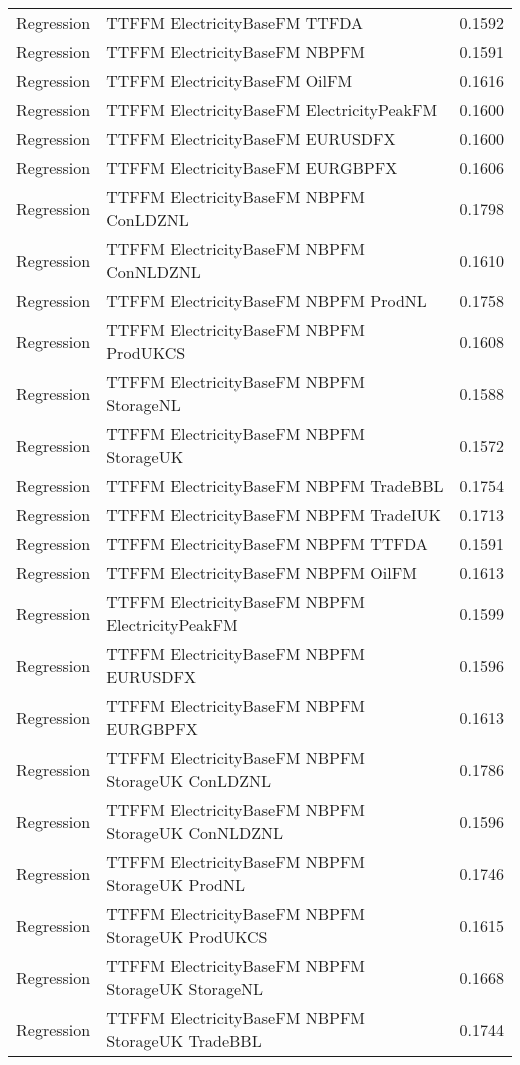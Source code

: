\begin{table}[h!]
\begin{adjustbox}{max width=\textwidth}
\begin{tabular}{llr}
  Regression & TTFFM ElectricityBaseFM TTFDA & 0.1592 \\ 
  Regression & TTFFM ElectricityBaseFM NBPFM & 0.1591 \\ 
  Regression & TTFFM ElectricityBaseFM OilFM & 0.1616 \\ 
  Regression & TTFFM ElectricityBaseFM ElectricityPeakFM & 0.1600 \\ 
  Regression & TTFFM ElectricityBaseFM EURUSDFX & 0.1600 \\ 
  Regression & TTFFM ElectricityBaseFM EURGBPFX & 0.1606 \\ 
  Regression & TTFFM ElectricityBaseFM NBPFM ConLDZNL & 0.1798 \\ 
  Regression & TTFFM ElectricityBaseFM NBPFM ConNLDZNL & 0.1610 \\ 
  Regression & TTFFM ElectricityBaseFM NBPFM ProdNL & 0.1758 \\ 
  Regression & TTFFM ElectricityBaseFM NBPFM ProdUKCS & 0.1608 \\ 
  Regression & TTFFM ElectricityBaseFM NBPFM StorageNL & 0.1588 \\ 
  Regression & TTFFM ElectricityBaseFM NBPFM StorageUK & 0.1572 \\ 
  Regression & TTFFM ElectricityBaseFM NBPFM TradeBBL & 0.1754 \\ 
  Regression & TTFFM ElectricityBaseFM NBPFM TradeIUK & 0.1713 \\ 
  Regression & TTFFM ElectricityBaseFM NBPFM TTFDA & 0.1591 \\ 
  Regression & TTFFM ElectricityBaseFM NBPFM OilFM & 0.1613 \\ 
  Regression & TTFFM ElectricityBaseFM NBPFM ElectricityPeakFM & 0.1599 \\ 
  Regression & TTFFM ElectricityBaseFM NBPFM EURUSDFX & 0.1596 \\ 
  Regression & TTFFM ElectricityBaseFM NBPFM EURGBPFX & 0.1613 \\ 
  Regression & TTFFM ElectricityBaseFM NBPFM StorageUK ConLDZNL & 0.1786 \\ 
  Regression & TTFFM ElectricityBaseFM NBPFM StorageUK ConNLDZNL & 0.1596 \\ 
  Regression & TTFFM ElectricityBaseFM NBPFM StorageUK ProdNL & 0.1746 \\ 
  Regression & TTFFM ElectricityBaseFM NBPFM StorageUK ProdUKCS & 0.1615 \\ 
  Regression & TTFFM ElectricityBaseFM NBPFM StorageUK StorageNL & 0.1668 \\ 
  Regression & TTFFM ElectricityBaseFM NBPFM StorageUK TradeBBL & 0.1744 \\ 

\end{tabular}
\end{adjustbox}
\end{table}
